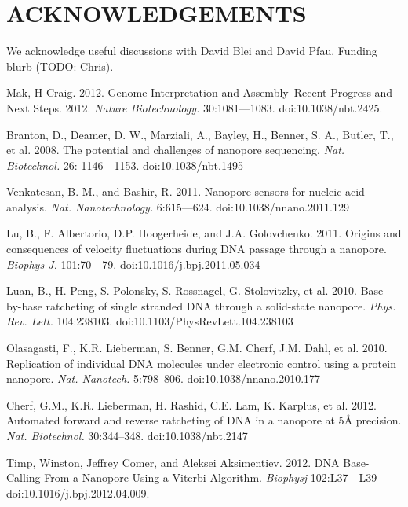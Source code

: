 \documentclass{biophys_letter}
\begin{document}
\section*{ACKNOWLEDGEMENTS}

We acknowledge useful discussions with David Blei and David Pfau. Funding blurb (TODO: Chris).

\begin{thebibliography}{99}

  Mak, H Craig. 
  2012.
  Genome Interpretation and Assembly--Recent Progress and Next Steps.
  2012.
  {\it Nature Biotechnology.}
  30:1081---1083.
  doi:10.1038/nbt.2425.

  Branton, D., Deamer, D. W., Marziali, A., Bayley, H., Benner, S. A., Butler, T., et al.
  2008.
  The potential and challenges of nanopore sequencing.
  {\it Nat. Biotechnol.}
  26: 1146---1153.
  doi:10.1038/nbt.1495

  Venkatesan, B. M., and Bashir, R.
  2011.
  Nanopore sensors for nucleic acid analysis.
  {\it Nat. Nanotechnology.}
  6:615---624.
  doi:10.1038/nnano.2011.129

  Lu, B., F. Albertorio, D.P. Hoogerheide, and J.A. Golovchenko.
  2011.
  Origins and consequences of velocity fluctuations during DNA passage through a nanopore.
  {\it Biophys J.}
  101:70---79.
  doi:10.1016/j.bpj.2011.05.034

  Luan, B., H. Peng, S. Polonsky, S. Rossnagel, G. Stolovitzky, et al.
  2010.
  Base-by-base ratcheting of single stranded DNA through a solid-state nanopore.
  {\it Phys. Rev. Lett.}
  104:238103.
  doi:10.1103/PhysRevLett.104.238103

  Olasagasti, F., K.R. Lieberman, S. Benner, G.M. Cherf, J.M. Dahl, et al.
  2010.
  Replication of individual DNA molecules under electronic control using a protein nanopore.
  {\it Nat. Nanotech.}
  5:798--806.
  doi:10.1038/nnano.2010.177

  Cherf, G.M., K.R. Lieberman, H. Rashid, C.E. Lam, K. Karplus, et al.
  2012.
  Automated forward and reverse ratcheting of DNA in a nanopore at 5{\AA} precision.
  {\it Nat. Biotechnol.}
  30:344--348.
  doi:10.1038/nbt.2147

  Timp, Winston, Jeffrey Comer, and Aleksei Aksimentiev. 
  2012.
  DNA Base-Calling From a Nanopore Using a Viterbi Algorithm.
  {\it Biophysj}
  102:L37---L39
  doi:10.1016/j.bpj.2012.04.009.


\end{thebibliography}
\end{document}
